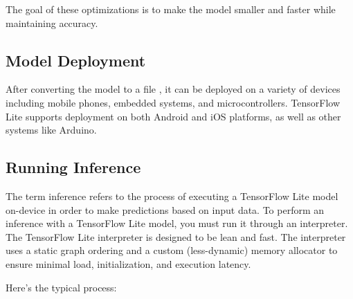 The goal of these optimizations is to make the model smaller and faster while maintaining accuracy.

\subsection{Model Deployment}
After converting the model to a file , it can be deployed on a variety of devices including mobile phones, embedded systems, and microcontrollers. TensorFlow Lite supports deployment on both Android and iOS platforms, as well as other systems like Arduino.

\subsection{Running Inference}
The term inference refers to the process of executing a TensorFlow Lite model on-device in order to make predictions based on input data. To perform an inference with a TensorFlow Lite model, you must run it through an interpreter. The TensorFlow Lite interpreter is designed to be lean and fast. The interpreter uses a static graph ordering and a custom (less-dynamic) memory allocator to ensure minimal load, initialization, and execution latency. \cite{TensorFlowLiteInference:2024} \cite{GoogleAIEdge:2024}

Here’s the typical process:

